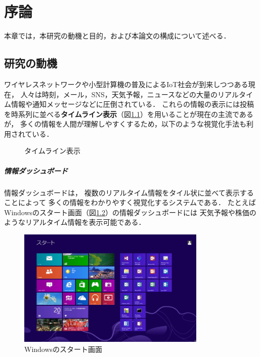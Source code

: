 \chapter{序論}
\label{chap:introduction}

本章では，本研究の動機と目的，および本論文の構成について述べる．

\newpage

\section{研究の動機}

ワイヤレスネットワークや小型計算機の普及によるIoT社会が到来しつつある現在，
人々は時刻，メール，SNS，天気予報，ニュースなどの大量のリアルタイム情報や通知メッセージなどに圧倒されている．
これらの情報の表示には投稿を時系列に並べる{\bf タイムライン表示}（図\ref{timeline}）を用いることが現在の主流であるが，
多くの情報を人間が理解しやすくするため，以下のような視覚化手法も利用されている．

\begin{figure}[H]
\centering
{}
\caption{タイムライン表示}
\label{timeline}
\end{figure}

\vspace{3mm}

\paragraph*{情報ダッシュボード}

情報ダッシュボード\cite{few}は，
複数のリアルタイム情報をタイル状に並べて表示することによって
多くの情報をわかりやすく視覚化するシステムである．
たとえばWindowsのスタート画面（図\ref{windows}）の情報ダッシュボードには
天気予報や株価のようなリアルタイム情報を表示可能である．

\begin{figure}[H]
\centering
\includegraphics[width=9cm]{images/windows.png}
\caption{Windowsのスタート画面}
\label{windows}
\end{figure}

